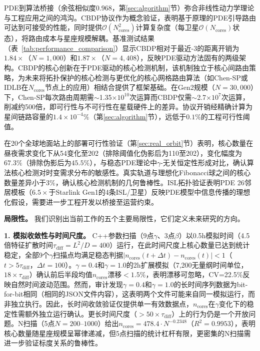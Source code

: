 \documentclass[sn-nature,pdflatex]{sn-jnl}
\begin{document}
PDE到算法桥接（余弦相似度$0.968$，第\ref{sec:algorithm}节）弥合非线性动力学理论与工程应用之间的鸿沟。CBDP协议作为概念验证，表明基于原理的PDE引导路由可达到可接受的性能，同时提供$\mathcal{O}(N_{\text{cores}}^2)$计算复杂度（每卫星$\mathcal{O}(N_{\text{cores}})$状态），将路由成本与星座规模解耦。基准测试结果（表~\ref{tab:performance_comparison}）显示CBDP相对于最近-3的距离开销为$1.84\times$（$N=1,000$）和$1.87\times$（$N=4,408$），反映PDE驱动方法固有的两级架构。CBDP的核心创新在于PDE驱动的核心检测机制，该机制独立于核心间路由策略，为未来将拓扑保护的核心检测与更优化的核心网格路由算法（如Chen-SP或IDLB在$N_{\text{cores}}$节点上的应用）相结合提供了框架基础。在Gen2规模（$N=30,000$）下，Chen-SP每次路由周期需$\sim$1.35$\times 10^{10}$次运算而CBDP仅需$\sim$2.7$\times 10^{7}$次运算，削减约500倍，即可行性与不可行性在星载硬件上的差异。协议开销经精确计算为星间链路容量的$1.4 \times 10^{-4}\%$（第\ref{sec:algorithm}节），远低于$0.1\%$的工程可行性阈值。

在20个全球地面站上的部署可行性验证（第\ref{sec:real_orbit}节）表明，核心数量在昼夜需求变化下从54变化至202（排除阈值化伪影后为110至202），变化幅度为$67.3\%$（排除伪影后为$45.5\%$），与稳态PDE理论中$\gamma$-无关恒定性形成对比，确认算法核心检测对时变需求分布的敏感性。真实轨道与理想化Fibonacci球之间的核心数量差异小于$3\%$，确认核心检测机制的几何鲁棒性。ISL拓扑验证表明PDE 26邻居模板（$6.5\times$于Starlink Gen1的4条ISL/卫星）反映PDE模型中信息传播的理想化假设，需要进一步工程开发以桥接至运营约束。

\bigskip\noindent\textbf{局限性。}
我们识别出当前工作的五个主要局限性，它们定义未来研究的方向。

\textbf{1. 模拟收敛性与时间尺度。}
C++参数扫描（9点$\gamma$、3点$\beta$）以0.5h模拟时间（4.5倍特征扩散时间$\tau_{\text{diff}} = L^2/D = 400$）运行，在此时间尺度上核心数量已达到统计稳定，全部9个$\gamma$扫描点均满足稳态判据$|n_{\text{cores}}(t + \Delta t) - n_{\text{cores}}(t)| < 1$（$t > 5\tau_{\text{diff}}$，$\Delta t = 100$）。$\gamma = 0.4$和$\gamma = 1.0$的2h扩展模拟（7,200无量纲时间单位，$18\times\tau_{\text{diff}}$）确认前后半段均值$n_{\text{cores}}$漂移$<1.5\%$，表明漂移可忽略，CV=22.5\%反映自然时间波动范围。然而，审计发现$\gamma = 0.4$和$\gamma = 1.0$的长时间序列数据为bit-for-bit相同（相同的JSON文件内容），这表明两个文件可能来自同一模拟运行，而非独立执行。因此，长时间收敛验证仅提供单一有效数据点，$n_{\text{cores}}$在$\gamma$变化下的稳定性需额外独立运行确认。更长时间尺度（$>50\times\tau_{\text{diff}}$）上的行为仍是一个开放问题。N扫描（5点$N=200$--$1000$）给出$n_{\text{cores}} = 478.4 \cdot N^{-0.2348}$（$R^2=0.9953$），表明核心数量随星座规模呈幂律递减，但5点扫描的统计杠杆有限，更密集的N扫描需进一步验证标度关系的鲁棒性。
\end{document}
